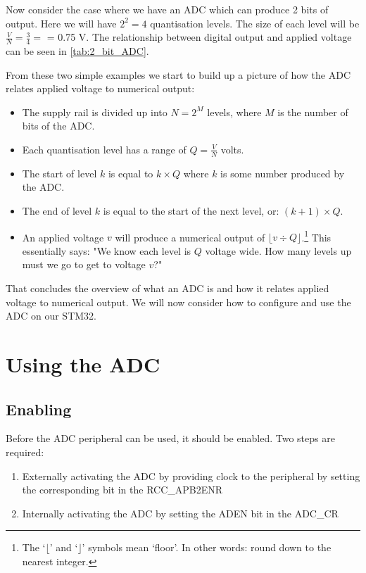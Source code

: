 Now consider the case where we have an ADC which can produce 2 bits of output. Here we will have $2^2 = 4$ quantisation levels. The size of each level will be $\frac{V}{N} = \frac{3}{4} =$ = 0.75 V. The relationship between digital output and applied voltage can be seen in \autoref{tab:2_bit_ADC}.


From these two simple examples we start to build up a picture of how the ADC relates applied voltage to numerical output:
\begin{itemize}
\item The supply rail is divided up into $N = 2^M$ levels, where $M$ is the number of bits of the ADC.
\item Each quantisation level has a range of $Q = \frac{V}{N}$ volts.
\item The start of level $k$ is equal to $k \times Q$ where $k$ is some number produced by the ADC.
\item The end of level $k$ is equal to the start of the next level, or: $(k+1) \times Q$.
\item An applied voltage $v$ will produce a numerical output of $\lfloor v \div Q \rfloor $.\footnote{The `$\lfloor$' and `$\rfloor$' symbols mean `floor'. In other words: round down to the nearest integer.} This essentially says: "We know each level is $Q$ voltage wide. How many levels up must we go to get to voltage $v$?"
\end{itemize}

That concludes the overview of what an ADC is and how it relates applied voltage to numerical output. We will now consider how to configure and use the ADC on our STM32.

\section{Using the ADC}
\subsection{Enabling}
Before the ADC peripheral can be used, it should be enabled. Two steps are required: 
\begin{enumerate}
\item Externally activating the ADC by providing clock to the peripheral by setting the corresponding bit in the RCC\_APB2ENR
\item Internally activating the ADC by setting the ADEN bit in the ADC\_CR
\end{enumerate}

